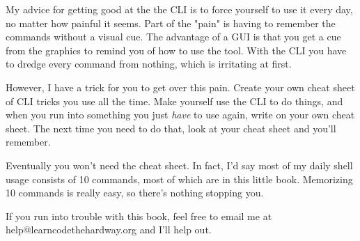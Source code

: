 My advice for getting good at the the CLI is to force yourself to use it every
day, no matter how painful it seems.  Part of the "pain" is having to remember
the commands without a visual cue.  The advantage of a GUI is that you get a
cue from the graphics to remind you of how to use the tool.  With the CLI you
have to dredge every command from nothing, which is irritating at first.

However, I have a trick for you to get over this pain.  Create your own cheat
sheet of CLI tricks you use all the time.  Make yourself use the CLI to do
things, and when you run into something you just \emph{have} to use again, 
write on your own cheat sheet.  The next time you need to do that, look at
your cheat sheet and you'll remember.

Eventually you won't need the cheat sheet.  In fact, I'd say most of my
daily shell usage consists of 10 commands, most of which are in this little
book.  Memorizing 10 commands is really easy, so there's nothing stopping you.

If you run into trouble with this book, feel free to email me at 
help@learncodethehardway.org and I'll help out.
